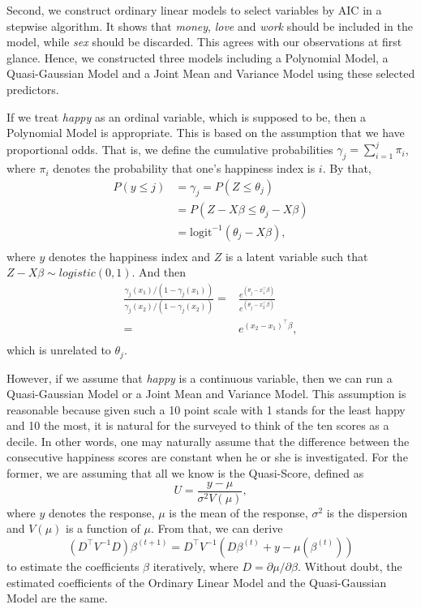 \documentclass[11pt,letterpaper]{article}
\begin{document}
Second, we construct ordinary linear models to select variables by AIC in a stepwise algorithm. It shows that \emph{money}, \emph{love} and \emph{work} should be included in the model, while \emph{sex} should be discarded. This agrees with our observations at first glance. Hence, we constructed three models including a Polynomial Model, a Quasi-Gaussian Model and a Joint Mean and Variance Model using these selected predictors. \par
If we treat \emph{happy} as an ordinal variable, which is supposed to be, then a Polynomial Model is appropriate. This is based on the assumption that we have proportional odds. That is, we define the cumulative probabilities $\gamma_j=\sum_{i=1}^j \pi_i$, where $\pi_i$ denotes the probability that one's happiness index is $i$. By that,
\begin{equation*}
\begin{aligned}
P(y\leq j)&=\gamma_j=P(Z\leq\theta_j) \\
&=P(Z-X\beta\leq\theta_j-X\beta) \\
&=\mathrm{logit}^{-1}(\theta_j-X\beta), \\
\end{aligned}
\end{equation*}
where $y$ denotes the happiness index and $Z$ is a latent variable such that $Z-X\beta\sim logistic(0,1)$. And then
\begin{equation*}
\begin{aligned}
\frac{\gamma_j(x_1)/(1-\gamma_j(x_1))}{\gamma_j(x_2)/(1-\gamma_j(x_2))}=&\frac{e^{(\theta_j-x_1^\top\beta)}}{e^{(\theta_j-x_2^\top\beta)}} \\
=&e^{(x_2-x_1)^\top\beta}, \\
\end{aligned}
\end{equation*}
which is unrelated to $\theta_j$. \par
However, if we assume that \emph{happy} is a continuous variable, then we can run a Quasi-Gaussian Model or a Joint Mean and Variance Model. This assumption is reasonable because given such a 10 point scale with 1 stands for the least happy and 10 the most, it is natural for the surveyed to think of the ten scores as a decile. In other words, one may naturally assume that the difference between the consecutive happiness scores are constant when he or she is investigated. For the former, we are assuming that all we know is the Quasi-Score, defined as $$U=\frac{y-\mu}{\sigma^2V(\mu)},$$ where $y$ denotes the response, $\mu$ is the mean of the response, $\sigma^2$ is the dispersion and $V(\mu)$ is a function of $\mu$. From that, we can derive $$(D^\top V^{-1}D)\beta^{(t+1)}=D^\top V^{-1}(D\beta^{(t)}+y-\mu(\beta^{(t)}))$$ to estimate the coefficients $\beta$ iteratively, where $D=\partial\mu/\partial\beta$. Without doubt, the estimated coefficients of the Ordinary Linear Model and the Quasi-Gaussian Model are the same. \par
\end{document}
